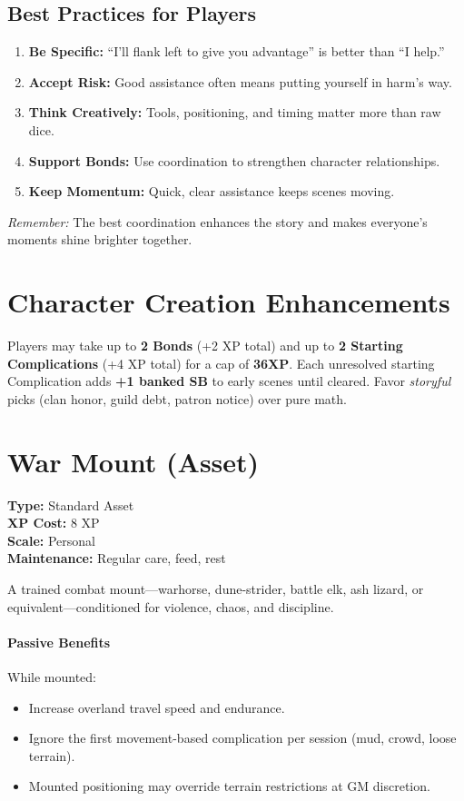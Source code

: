 \subsection{Best Practices for Players}
\begin{enumerate}
  \item \textbf{Be Specific:} ``I'll flank left to give you advantage'' is better than ``I help.''
  \item \textbf{Accept Risk:} Good assistance often means putting yourself in harm's way.
  \item \textbf{Think Creatively:} Tools, positioning, and timing matter more than raw dice.
  \item \textbf{Support Bonds:} Use coordination to strengthen character relationships.
  \item \textbf{Keep Momentum:} Quick, clear assistance keeps scenes moving.
\end{enumerate}

\emph{Remember:} The best coordination enhances the story and makes everyone's moments shine brighter together.

\section{Character Creation Enhancements}
Players may take up to \textbf{2 Bonds} (+2 XP total) and up to \textbf{2 Starting Complications} (+4 XP total) for a cap of \textbf{36XP}. Each unresolved starting Complication adds \textbf{+1 banked SB} to early scenes until cleared. Favor \emph{storyful} picks (clan honor, guild debt, patron notice) over pure math.

\section{War Mount (Asset)}
\label{subsec:war-mount}

\textbf{Type:} Standard Asset \\
\textbf{XP Cost:} 8 XP \\
\textbf{Scale:} Personal \\
\textbf{Maintenance:} Regular care, feed, rest

A trained combat mount---warhorse, dune-strider, battle elk, ash lizard, or equivalent---conditioned for violence, chaos, and discipline.

\paragraph{Passive Benefits}
While mounted:
\begin{itemize}
  \item Increase overland travel speed and endurance.
  \item Ignore the first movement-based complication per session (mud, crowd, loose terrain).
  \item Mounted positioning may override terrain restrictions at GM discretion.
\end{itemize}

